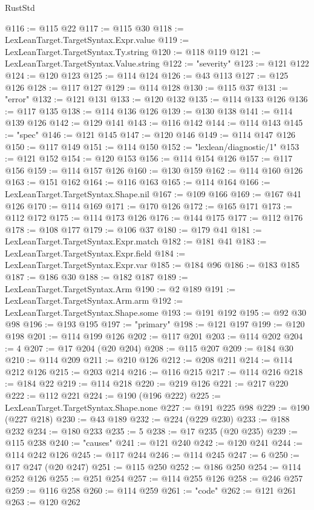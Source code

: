 \begin{lexlean}{RustStd}
\begin{coremodule}
@116 := @115 @22
@117 := @115 @30
@118 := LexLeanTarget.TargetSyntax.Expr.value
@119 := LexLeanTarget.TargetSyntax.Ty.string
@120 := @118 @119
@121 := LexLeanTarget.TargetSyntax.Value.string
@122 := "severity"
@123 := @121 @122
@124 := @120 @123
@125 := @114 @124
@126 := @43 @113
@127 := @125 @126
@128 := @117 @127
@129 := @114 @128
@130 := @115 @37
@131 := "error"
@132 := @121 @131
@133 := @120 @132
@135 := @114 @133 @126
@136 := @117 @135
@138 := @114 @136 @126
@139 := @130 @138
@141 := @114 @139 @126
@142 := @129 @141
@143 := @116 @142
@144 := @114 @143
@145 := "spec"
@146 := @121 @145
@147 := @120 @146
@149 := @114 @147 @126
@150 := @117 @149
@151 := @114 @150
@152 := "lexlean/diagnostic/1"
@153 := @121 @152
@154 := @120 @153
@156 := @114 @154 @126
@157 := @117 @156
@159 := @114 @157 @126
@160 := @130 @159
@162 := @114 @160 @126
@163 := @151 @162
@164 := @116 @163
@165 := @114 @164
@166 := LexLeanTarget.TargetSyntax.Shape.nil
@167 := @109 @166
@169 := @167 @41 @126
@170 := @114 @169
@171 := @170 @126
@172 := @165 @171
@173 := @112 @172
@175 := @114 @173 @126
@176 := @144 @175
@177 := @112 @176
@178 := @108 @177
@179 := @106 @37
@180 := @179 @41
@181 := LexLeanTarget.TargetSyntax.Expr.match
@182 := @181 @41
@183 := LexLeanTarget.TargetSyntax.Expr.field
@184 := LexLeanTarget.TargetSyntax.Expr.var
@185 := @184 @96
@186 := @183 @185
@187 := @186 @30
@188 := @182 @187
@189 := LexLeanTarget.TargetSyntax.Arm
@190 := @2 @189
@191 := LexLeanTarget.TargetSyntax.Arm.arm
@192 := LexLeanTarget.TargetSyntax.Shape.some
@193 := @191 @192
@195 := @92 @30 @98
@196 := @193 @195
@197 := "primary"
@198 := @121 @197
@199 := @120 @198
@201 := @114 @199 @126
@202 := @117 @201
@203 := @114 @202
@204 := 4
@207 := @17 @204 (@20 @204)
@208 := @115 @207
@209 := @184 @30
@210 := @114 @209
@211 := @210 @126
@212 := @208 @211
@214 := @114 @212 @126
@215 := @203 @214
@216 := @116 @215
@217 := @114 @216
@218 := @184 @22
@219 := @114 @218
@220 := @219 @126
@221 := @217 @220
@222 := @112 @221
@224 := @190 (@196 @222)
@225 := LexLeanTarget.TargetSyntax.Shape.none
@227 := @191 @225 @98
@229 := @190 (@227 @218)
@230 := @43 @189
@232 := @224 (@229 @230)
@233 := @188 @232
@234 := @180 @233
@235 := 5
@238 := @17 @235 (@20 @235)
@239 := @115 @238
@240 := "causes"
@241 := @121 @240
@242 := @120 @241
@244 := @114 @242 @126
@245 := @117 @244
@246 := @114 @245
@247 := 6
@250 := @17 @247 (@20 @247)
@251 := @115 @250
@252 := @186 @250
@254 := @114 @252 @126
@255 := @251 @254
@257 := @114 @255 @126
@258 := @246 @257
@259 := @116 @258
@260 := @114 @259
@261 := "code"
@262 := @121 @261
@263 := @120 @262

\end{coremodule}
\end{lexlean}

